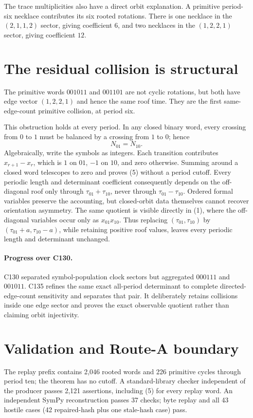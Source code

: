 \documentclass[10pt]{article}
\begin{document}
The trace multiplicities also have a direct orbit explanation.  A primitive
period-six necklace contributes its six rooted rotations.  There is one
necklace in the $(2,1,1,2)$ sector, giving coefficient $6$, and two necklaces
in the $(1,2,2,1)$ sector, giving coefficient $12$.

\section{The residual collision is structural}
The primitive words $001011$ and $001101$ are not cyclic rotations, but both
have edge vector $(1,2,2,1)$ and hence the same roof time.  They are the first
same-edge-count primitive collision, at period six.

This obstruction holds at every period.  In any closed binary word, every
crossing from $0$ to $1$ must be balanced by a crossing from $1$ to $0$;
hence
\begin{equation}
N_{01}=N_{10}. \tag{5}
\end{equation}
Algebraically, write the symbols as integers.  Each transition contributes
$x_{r+1}-x_r$, which is $1$ on $01$, $-1$ on $10$, and zero otherwise.
Summing around a closed word telescopes to zero and proves (5) without a
period cutoff.
Every periodic length and determinant coefficient consequently depends on the
off-diagonal roof only through $\tau_{01}+\tau_{10}$, never through
$\tau_{01}-\tau_{10}$.  Ordered formal variables preserve the accounting,
but closed-orbit data themselves cannot recover orientation asymmetry.  The
same quotient is visible directly in (1), where the off-diagonal variables
occur only as $x_{01}x_{10}$.  Thus replacing
$(\tau_{01},\tau_{10})$ by $(\tau_{01}+a,\tau_{10}-a)$, while retaining
positive roof values, leaves every periodic length and determinant unchanged.

\paragraph{Progress over C130.}
C130 separated symbol-population clock sectors but aggregated $000111$ and
$001011$.  C135 refines the same exact all-period determinant to complete
directed-edge-count sensitivity and separates that pair.  It deliberately
retains collisions inside one edge sector and proves the exact observable
quotient rather than claiming orbit injectivity.

\section{Validation and Route-A boundary}
The replay prefix contains 2,046 rooted words and 226 primitive cycles through
period ten; the theorem has no cutoff.  A standard-library checker independent
of the producer passes 2,121 assertions, including (5) for every replay word.
An independent SymPy reconstruction passes 37 checks; byte replay and all 43
hostile cases (42 repaired-hash plus one stale-hash case) pass.
\end{document}
